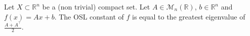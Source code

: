\begin{proposition}
Let $X \subset \mathbb{R}^n$ be a (non trivial) compact set.
 Let $A \in \mathcal{M}_n (\mathbb{R})$, $b \in \mathbb{R}^n$ and $f(x)=A x + b$. 
 The OSL constant of $f$ is equal to the greatest eigenvalue of $\frac{A + A^\top}{2}$.
\end{proposition}
\vspace{1em}

